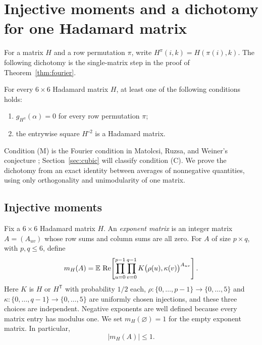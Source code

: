 \section{Injective moments and a dichotomy for one Hadamard matrix}
\label{sec:pair}

For a matrix $H$ and a row permutation $\pi$, write $H^\pi(i,k)=H(\pi(i),k)$.
The following dichotomy is the single-matrix step in the proof of
Theorem~\ref{thm:fourier}.

\begin{corollary}[Dichotomy]
\label{cor:dichotomy}
For every $6\times6$ Hadamard matrix $H$, at least one of the following
conditions holds:
\begin{enumerate}[label=\textup{(\Alph*)},ref=\Alph*]
  \item[(M)] $g_{H^\pi}(\alpha)=0$ for every row permutation $\pi$;
  \item[(C)] the entrywise square $H^{\circ2}$ is a Hadamard matrix.
\end{enumerate}
\end{corollary}

Condition (M) is the Fourier condition in
Matolcsi, Ruzsa, and Weiner's conjecture
\cite[Conjecture~2.3]{MatolcsiRuzsaWeiner2013}; Section~\ref{sec:cubic}
will classify condition (C). We prove the dichotomy from an exact identity
between averages of nonnegative quantities, using only orthogonality and
unimodularity of one matrix.

\subsection{Injective moments}

Fix a $6\times6$ Hadamard matrix $H$.  An \emph{exponent matrix} is an
integer matrix $A=(A_{uv})$ whose row sums and column sums are all zero.
For $A$ of size $p\times q$, with $p,q\leq6$, define
\begin{equation}
  m_H(A)=
  \mathbb E\,\operatorname{Re}\!\left[
    \prod_{u=0}^{p-1}\prod_{v=0}^{q-1}
      K\bigl(\rho(u),\kappa(v)\bigr)^{A_{uv}}
  \right].
  \label{eq:injective-moment}
\end{equation}
Here $K$ is $H$ or $H^{\mathsf T}$ with probability $1/2$ each,
$\rho:\{0,\ldots,p-1\}\to\{0,\ldots,5\}$ and
$\kappa:\{0,\ldots,q-1\}\to\{0,\ldots,5\}$ are uniformly chosen
injections, and these three choices are independent.  Negative exponents
are well defined because every matrix entry has modulus one.  We set
$m_H(\varnothing)=1$ for the empty exponent matrix.  In particular,
\begin{equation}
  |m_H(A)|\leq1.
  \label{eq:injective-bound}
\end{equation}

